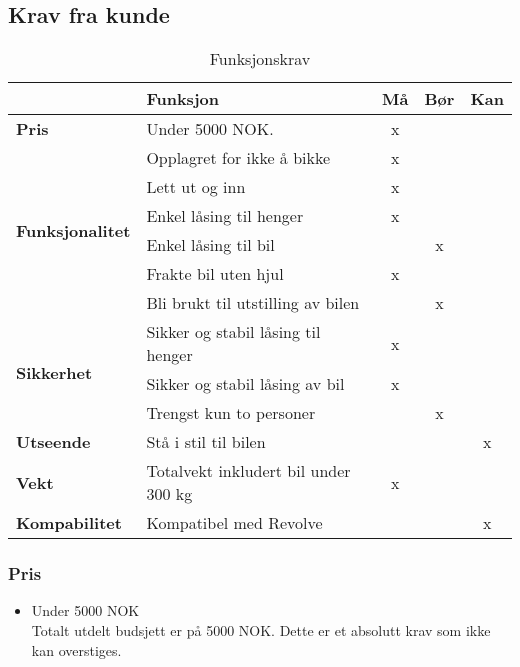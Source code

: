 \subsection{Krav fra kunde}
\begin{table}[H]
\begin{tabular}{|l|l|c|c|c|}
\hline
 & \textbf{Funksjon} & \textbf{Må} & \textbf{Bør} & \textbf{Kan} \\ \hline
\textbf{Pris} & Under 5000 NOK. & x & & \\
\hline
\multirow{6}{*}{\textbf{Funksjonalitet}} 
 & Opplagret for ikke å bikke & x & & \\
 & Lett ut og inn & x & & \\
 & Enkel låsing til henger & x & & \\
 & Enkel låsing til bil & & x & \\
 & Frakte bil uten hjul & x & & \\
 & Bli brukt til utstilling av bilen & & x & \\
\hline
\multirow{3}{*}{\textbf{Sikkerhet}}
 & Sikker og stabil låsing til henger & x & & \\
 & Sikker og stabil låsing av bil & x & & \\
 & Trengst kun to personer & & x & \\
\hline
\textbf{Utseende} & Stå i stil til bilen & &  & x \\ \hline
\textbf{Vekt} & Totalvekt inkludert bil under 300 kg & x & & \\ \hline
\textbf{Kompabilitet} & Kompatibel med Revolve & & & x \\ \hline
\end{tabular}
\caption{Funksjonskrav}
\end{table}


\subsubsection{Pris}
\begin{itemize}
\item Under 5000 NOK \\
Totalt utdelt budsjett er på 5000 NOK. Dette er et absolutt krav som ikke kan overstiges.
\end{itemize}
